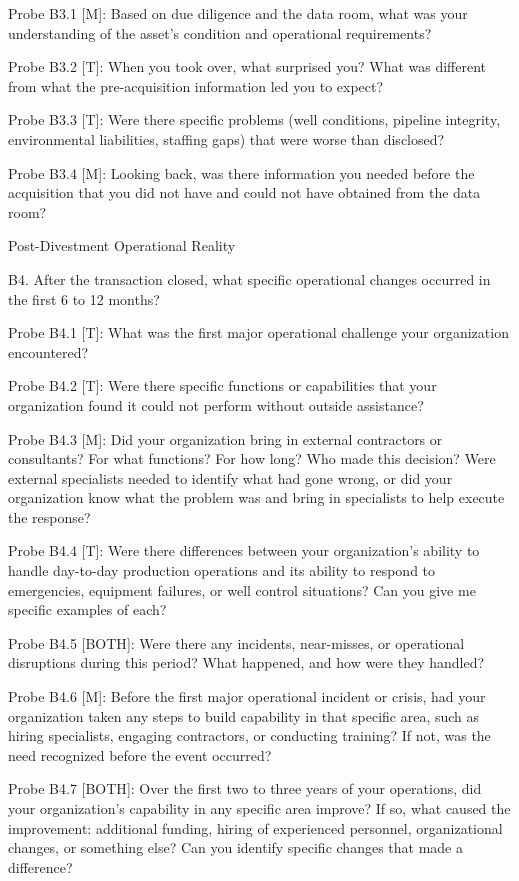 \documentclass[twoside,fontset=lmodern]{mitthesis}
\begin{document}
Probe B3.1 {[}M{]}: Based on due diligence and the data room, what was
your understanding of the asset's condition and operational
requirements?

Probe B3.2 {[}T{]}: When you took over, what surprised you? What was
different from what the pre-acquisition information led you to expect?

Probe B3.3 {[}T{]}: Were there specific problems (well conditions,
pipeline integrity, environmental liabilities, staffing gaps) that were
worse than disclosed?

Probe B3.4 {[}M{]}: Looking back, was there information you needed
before the acquisition that you did not have and could not have obtained
from the data room?

Post-Divestment Operational Reality

B4. After the transaction closed, what specific operational changes
occurred in the first 6 to 12 months?

Probe B4.1 {[}T{]}: What was the first major operational challenge your
organization encountered?

Probe B4.2 {[}T{]}: Were there specific functions or capabilities that
your organization found it could not perform without outside assistance?

Probe B4.3 {[}M{]}: Did your organization bring in external contractors
or consultants? For what functions? For how long? Who made this
decision? Were external specialists needed to identify what had gone
wrong, or did your organization know what the problem was and bring in
specialists to help execute the response?

Probe B4.4 {[}T{]}: Were there differences between your organization's
ability to handle day-to-day production operations and its ability to
respond to emergencies, equipment failures, or well control situations?
Can you give me specific examples of each?

Probe B4.5 {[}BOTH{]}: Were there any incidents, near-misses, or
operational disruptions during this period? What happened, and how were
they handled?

Probe B4.6 {[}M{]}: Before the first major operational incident or
crisis, had your organization taken any steps to build capability in
that specific area, such as hiring specialists, engaging contractors, or
conducting training? If not, was the need recognized before the event
occurred?

Probe B4.7 {[}BOTH{]}: Over the first two to three years of your
operations, did your organization's capability in any specific area
improve? If so, what caused the improvement: additional funding, hiring
of experienced personnel, organizational changes, or something else? Can
you identify specific changes that made a difference?
\end{document}
